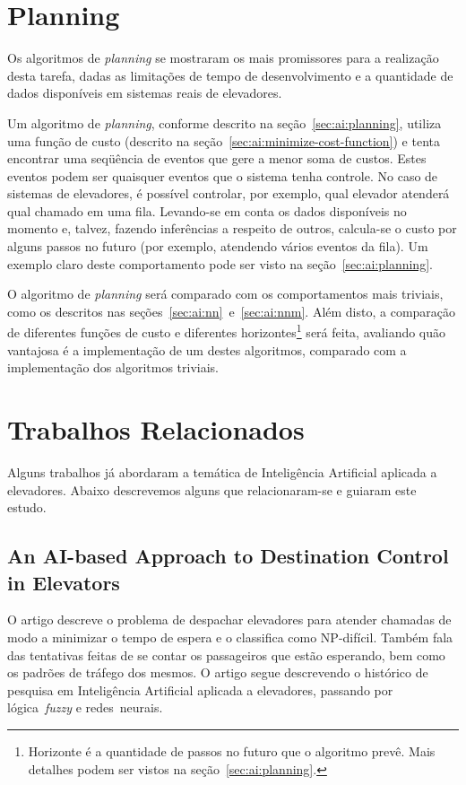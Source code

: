 \section{\label{sec:proposal:planning}Planning}

Os algoritmos de \textit{planning} se mostraram os mais promissores para a
realização desta tarefa, dadas as limitações de tempo de desenvolvimento e a
quantidade de dados disponíveis em sistemas reais de elevadores.

Um algoritmo de \textit{planning}, conforme descrito na
seção~\ref{sec:ai:planning}, utiliza uma função de custo (descrito na
seção~\ref{sec:ai:minimize-cost-function}) e tenta encontrar uma seqüência de
eventos que gere a menor soma de custos. Estes eventos podem ser quaisquer
eventos que o sistema tenha controle. No caso de sistemas de elevadores, é
possível controlar, por exemplo, qual elevador atenderá qual chamado em uma
fila. Levando-se em conta os dados disponíveis no momento e, talvez, fazendo
inferências a respeito de outros, calcula-se o custo por alguns passos no futuro
(por exemplo, atendendo vários eventos da fila). Um exemplo claro deste
comportamento pode ser visto na seção~\ref{sec:ai:planning}.

O algoritmo de \textit{planning} será comparado com os comportamentos mais
triviais, como os descritos nas seções~\ref{sec:ai:nn}~e~\ref{sec:ai:nnm}. Além
disto, a comparação de diferentes funções de custo e diferentes
horizontes\footnote{Horizonte é a quantidade de passos no futuro que o algoritmo
prevê. Mais detalhes podem ser vistos na seção~\ref{sec:ai:planning}.} será
feita, avaliando quão vantajosa é a implementação de um destes algoritmos,
comparado com a implementação dos algoritmos triviais.


\section{\label{chap:related}Trabalhos Relacionados}

Alguns trabalhos já abordaram a temática de Inteligência Artificial aplicada a
elevadores. Abaixo descrevemos alguns que relacionaram-se e guiaram este estudo.

\subsection{\label{section:koehler}An AI-based Approach to Destination Control in
Elevators~\cite{KOEHLEROTTIGER02}}

O artigo descreve o problema de despachar elevadores para atender chamadas de
modo a minimizar o tempo de espera e o classifica como NP-difícil. Também fala
das tentativas feitas de se contar os passageiros que estão esperando, bem como
os padrões de tráfego dos mesmos. O artigo segue descrevendo o histórico de
pesquisa em Inteligência Artificial aplicada a elevadores, passando por
lógica~\textit{fuzzy} e redes~neurais.


